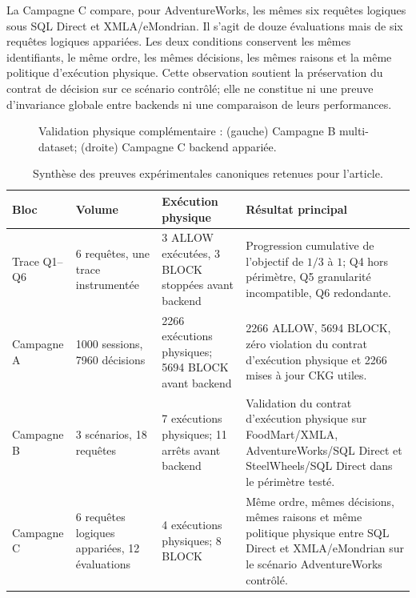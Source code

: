 La Campagne C compare, pour AdventureWorks, les mêmes six requêtes
logiques sous SQL Direct et XMLA/eMondrian. Il s'agit de douze
évaluations mais de six requêtes logiques appariées. Les deux
conditions conservent les mêmes identifiants, le même ordre, les
mêmes décisions, les mêmes raisons et la même politique d'exécution
physique. Cette observation soutient la préservation du contrat de
décision sur ce scénario contrôlé; elle ne constitue ni une preuve
d'invariance globale entre backends ni une comparaison de leurs
performances.

\begin{figure}[!t]
\centering
\begin{minipage}[t]{0.49\textwidth}
\centering

\end{minipage}\hfill
\begin{minipage}[t]{0.49\textwidth}
\centering

\end{minipage}
\caption{Validation physique complémentaire : (gauche) Campagne B multi-dataset; (droite) Campagne C backend appariée.}
\label{fig:v4-campaign-bc}
\end{figure}


\begin{table}[t]
\centering
\caption{Synthèse des preuves expérimentales canoniques retenues pour l'article.}
\label{tab:experimental-evidence-final}
\small
\begin{tabular}{p{}p{}p{}p{}}
\hline
Bloc & Volume & Exécution physique & Résultat principal \\
\hline
Trace Q1--Q6
& 6 requêtes, une trace instrumentée
& 3 ALLOW exécutées, 3 BLOCK stoppées avant backend
& Progression cumulative de l'objectif de $1/3$ à $1$; Q4 hors périmètre, Q5 granularité incompatible, Q6 redondante. \\

Campagne A
& 1000 sessions, 7960 décisions
& 2266 exécutions physiques; 5694 BLOCK avant backend
& 2266 ALLOW, 5694 BLOCK, zéro violation du contrat d'exécution physique et 2266 mises à jour CKG utiles. \\

Campagne B
& 3 scénarios, 18 requêtes
& 7 exécutions physiques; 11 arrêts avant backend
& Validation du contrat d'exécution physique sur FoodMart/XMLA, AdventureWorks/SQL Direct et SteelWheels/SQL Direct dans le périmètre testé. \\

Campagne C
& 6 requêtes logiques appariées, 12 évaluations
& 4 exécutions physiques; 8 BLOCK
& Même ordre, mêmes décisions, mêmes raisons et même politique physique entre SQL Direct et XMLA/eMondrian sur le scénario AdventureWorks contrôlé. \\
\hline
\end{tabular}
\end{table}


